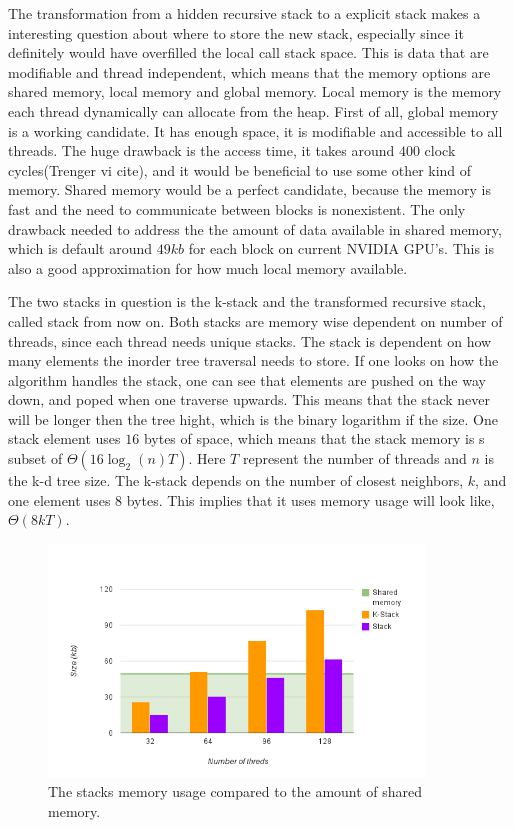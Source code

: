 The transformation from a hidden recursive stack to a explicit stack makes a interesting question about where to store the new stack, especially
since it definitely would have overfilled the local call stack space. This is data that are modifiable and thread independent, which means that the memory options are shared memory, local memory and global memory. Local memory is the memory each thread dynamically can allocate from the heap. First of all, global memory is a working candidate. It has enough space, it is modifiable and accessible to all threads. The huge drawback is the access time, it takes around $400$ clock cycles(Trenger vi cite), and it would be beneficial to use some other kind of memory. Shared memory would be a perfect candidate, because the memory is fast and the need to communicate between blocks is nonexistent. The only drawback needed to address the the amount of data available in shared memory, which is default around $49 kb$ for each block on current NVIDIA GPU's. This is also a good approximation for how much local memory available.

The two stacks in question is the k-stack and the transformed recursive stack, called stack from now on. Both stacks are memory wise dependent on number of threads, since each thread needs unique stacks. The stack is dependent on how many elements the inorder tree traversal needs to store. If one looks on how the algorithm handles the stack, one can see that elements are pushed on the way down, and poped when one traverse upwards.  This means that the stack never will be longer then the tree hight, which is the binary logarithm if the size. One stack element uses $16$ bytes of space, which means that the stack memory is s subset of $\Theta(16\log_2(n)T)$. Here $T$ represent the number of threads and $n$ is the k-d tree size. The k-stack depends on the number of closest neighbors, $k$, and one element uses $8$ bytes. This implies that it uses memory usage will look like, $\Theta(8kT)$.


\begin{figure}[ht!]
\centering
\includegraphics[width=100mm]{../gfx/shared_memory_and_stack.png}

\caption{The stacks memory usage compared to the amount of shared memory.}
\label{fig:stacks_and_shared_memory}
\end{figure}


